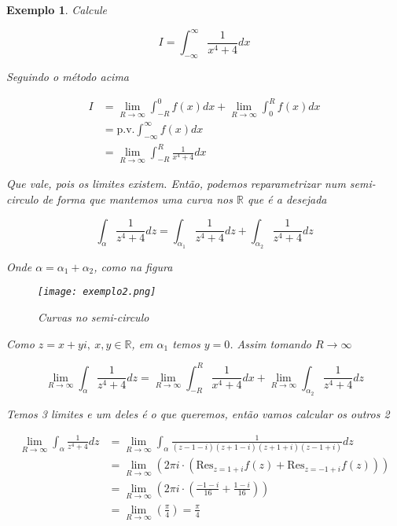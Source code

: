 \documentclass{article}
\newtheorem{ex}{Exemplo}
\begin{document}
\begin{ex}
Calcule

\begin{equation*}
    I = \int_{- \infty}^\infty \frac{1}{x^4 + 4} d x
\end{equation*}

Seguindo o método acima

\begin{align*}
    I &= \lim_{R \to \infty} \int_{-R}^0 f(x) d x + \lim_{R \to \infty} \int_0^R f(x) d x \\
    &= \mathrm{p.v.} \int_{- \infty}^\infty f(x) d x \\
    &= \lim_{R \to \infty} \int_{- R}^R \frac{1}{x^4 + 4} d x
\end{align*}

Que vale, pois os limites existem. Então, podemos reparametrizar num semi-circulo de forma que mantemos uma curva nos $\mathbb{R}$ que é a desejada

\begin{equation*}
    \int_\alpha \frac{1}{z^4 + 4} d z = \int_{\alpha_1} \frac{1}{z^4 + 4} d z + \int_{\alpha_2} \frac{1}{z^4 + 4} d z
\end{equation*}

Onde $\alpha = \alpha_1 + \alpha_2$, como na figura

\begin{figure}[H]
    \centering
    \texttt{[image: exemplo2.png]}
    \caption{Curvas no semi-circulo}
    \label{fig:ex2}
\end{figure}

Como $z = x + yi,\ x, y \in \mathbb{R}$, em $\alpha_1$ temos $y = 0$. Assim tomando $R \to \infty$

\begin{equation*}
    \lim_{R \to \infty} \int_\alpha \frac{1}{z^4 + 4} d z = \lim_{R \to \infty} \int_{-R}^R \frac{1}{x^4 + 4} d x + \lim_{R \to \infty} \int_{\alpha_2} \frac{1}{z^4 + 4} d z
\end{equation*}

Temos 3 limites e um deles é o que queremos, então vamos calcular os outros 2

\begin{align*}
    \lim_{R \to \infty} \int_\alpha \frac{1}{z^4 + 4} d z &= \lim_{R \to \infty} \int_\alpha \frac{1}{(z - 1 -i)(z +1 - i)(z + 1 + i)(z - 1 + i)}d z \\
    &= \lim_{R \to \infty} \left( 2 \pi i \cdot \left( \mathrm{Res}_{z = 1 + i} f(z) + \mathrm{Res}_{z = - 1 + i} f(z) \right) \right) \\
    &= \lim_{R \to \infty} \left( 2 \pi i \cdot \left( \frac{- 1 - i}{16} + \frac{1 - i}{16} \right) \right) \\
    &= \lim_{R \to \infty} \left( \frac{\pi}{4} \right) = \frac{\pi}{4}
\end{align*}


\end{ex}
\end{document}
